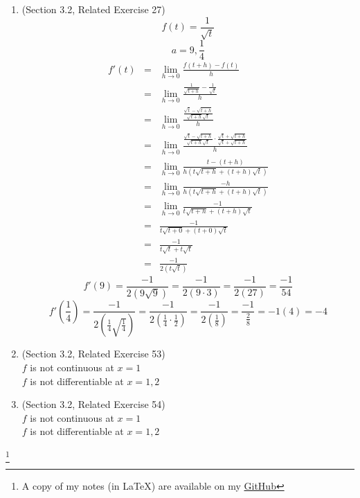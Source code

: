 \documentclass{article}
\newcommand\blfootnote[1]{
    \begingroup
    \renewcommand\thefootnote{}\footnote{#1}
    \addtocounter{footnote}{-1}
    \endgroup
}
\begin{document}
\begin{enumerate}
    \item (Section 3.2, Related Exercise 27)
        $$f(t) = \frac{1}{\sqrt{t}}$$
        $$a = 9, \frac{1}{4}$$
        \begin{eqnarray}
            f'(t) &=& \lim_{h \to 0}{\frac{f(t + h) - f(t)}{h}} \\
                  &=& \lim_{h \to 0}{\frac{\frac{1}{\sqrt{t + h}} - \frac{1}{\sqrt{t}}}{h}} \\
                  &=& \lim_{h \to 0}{\frac{\frac{\sqrt{t} - \sqrt{t + h}}{\sqrt{t + h}\sqrt{t}}}{h}} \\
                  &=& \lim_{h \to 0}{\frac{\frac{\sqrt{t} - \sqrt{t + h}}{\sqrt{t + h}\sqrt{t}} \cdot \frac{\sqrt{t} + \sqrt{t + h}}{\sqrt{t} + \sqrt{t + h}}}{h}} \\
                  &=& \lim_{h \to 0}{\frac{t - (t + h)}{h(t\sqrt{t + h} + (t + h)\sqrt{t})}} \\
                  &=& \lim_{h \to 0}{\frac{- h}{h(t\sqrt{t + h} + (t + h)\sqrt{t})}} \\
                  &=& \lim_{h \to 0}{\frac{- 1}{t\sqrt{t + h} + (t + h)\sqrt{t}}} \\
                  &=& \frac{- 1}{t\sqrt{t + 0} + (t + 0)\sqrt{t}} \\
                  &=& \frac{- 1}{t\sqrt{t} + t\sqrt{t}} \\
                  &=& \frac{- 1}{2(t\sqrt{t})}
        \end{eqnarray}
        $$f'(9) = \frac{-1}{2 \left (9\sqrt{9} \right )} = \frac{-1}{2 \left (9 \cdot 3 \right )} = \frac{-1}{2\left(27\right)} = \frac{-1}{54}$$
        $$f'\left(\frac{1}{4}\right) = \frac{-1}{2\left(\frac{1}{4}\sqrt{\frac{1}{4}}\right)} = \frac{-1}{2\left(\frac{1}{4} \cdot \frac{1}{2}\right)} = \frac{-1}{2\left(\frac{1}{8}\right)} = \frac{-1}{\frac{2}{8}} = -1\left(4\right) = -4$$
    \item (Section 3.2, Related Exercise 53)
    \\ $f$ is not continuous at $x = 1$
    \\ $f$ is not differentiable at $x = 1, 2$
    \item (Section 3.2, Related Exercise 54)
    \\ $f$ is not continuous at $x = 1$
    \\ $f$ is not differentiable at $x = 1, 2$
\end{enumerate}

\blfootnote{A copy of my notes (in \LaTeX) are available on my \href{https://github.com/onlinechronically/MATH-211}{GitHub}}
\end{document}
